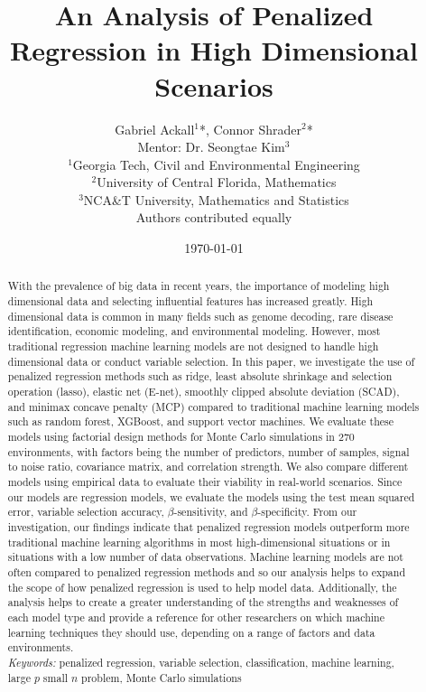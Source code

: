 \documentclass{article}
\title{An Analysis of Penalized Regression in High Dimensional Scenarios} %
\author{Gabriel Ackall$^1$*, Connor Shrader$^2$* \\
		Mentor: Dr. Seongtae Kim$^3$ \\	
		{\footnotesize $^1$Georgia Tech, Civil and Environmental Engineering} \\
		{\footnotesize $^2$University of Central  Florida, Mathematics} \\
		{\footnotesize $^3$NCA\&T University, Mathematics and Statistics} \\
		{\footnotesize *Authors contributed equally}}
\date{\today}
\begin{document}
\maketitle
\begin{abstract}
	With the prevalence of big data in recent years, the importance of modeling high dimensional data and selecting influential features has increased greatly. High dimensional data is common in many fields such as genome decoding, rare disease identification, economic modeling, and environmental modeling. However, most traditional regression machine learning models are not designed to handle high dimensional data or conduct variable selection. In this paper, we investigate the use of penalized regression methods such as ridge, least absolute shrinkage and selection operation (lasso), elastic net (E-net), smoothly clipped absolute deviation (SCAD), and minimax concave penalty (MCP) compared to traditional machine learning models such as random forest, XGBoost, and support vector machines. We evaluate these models using factorial design methods for Monte Carlo simulations in 270 environments, with factors being the number of predictors, number of samples, signal to noise ratio, covariance matrix, and correlation strength. We also compare different models using empirical data to evaluate their viability in real-world scenarios. Since our models are regression models, we evaluate the models using the test mean squared error, variable selection accuracy, $\beta$-sensitivity, and $\beta$-specificity. From our investigation, our findings indicate that penalized regression models outperform more traditional machine learning algorithms in most high-dimensional situations or in situations with a low number of data observations. Machine learning models are not often compared to penalized regression methods and so our analysis helps to expand the scope of how penalized regression is used to help model data. Additionally, the analysis helps to create a greater understanding of the strengths and weaknesses of each model type and provide a reference for other researchers on which machine learning techniques they should use, depending on a range of factors and data environments. \\
	
	\textit{Keywords:} penalized regression, variable selection, classification, machine learning, large $p$ small $n$ problem, Monte Carlo simulations
\end{abstract}

\newpage
\tableofcontents
\newpage
\end{document}
